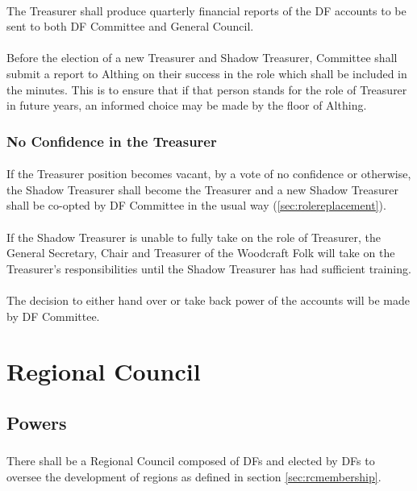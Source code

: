 \documentclass[a4paper, 12pt]{report}
\begin{document}
\paragraph{}
The Treasurer shall produce quarterly financial reports of the DF accounts to be sent to both DF Committee and General Council.
\paragraph{}
\label{sec:treasurerreport}
Before the election of a new Treasurer and Shadow Treasurer, Committee shall submit a report to Althing on their success in the role which shall be included in the minutes. This is to ensure that if that person stands for the role of Treasurer in future years, an informed choice may be made by the floor of Althing.
\subsubsection{No Confidence in the Treasurer}
\label{sec:treasurernoconfidence}
\paragraph{} If the Treasurer position becomes vacant, by a vote of no confidence or otherwise, the Shadow Treasurer shall become the Treasurer and a new Shadow Treasurer shall be co-opted by DF Committee in the usual way (\ref{sec:rolereplacement}).
\paragraph{} If the Shadow Treasurer is unable to fully take on the role of Treasurer, the General Secretary, Chair and Treasurer of the Woodcraft Folk will take on the Treasurer's responsibilities until the Shadow Treasurer has had sufficient training.
\paragraph{} The decision to either hand over or take back power of the accounts will be made by DF Committee.

\section{Regional Council}
\subsection{Powers}
\subsubsection{}
There shall be a Regional Council composed of DFs and elected by DFs to oversee the development of regions as defined in section \ref{sec:rcmembership}.
\end{document}
